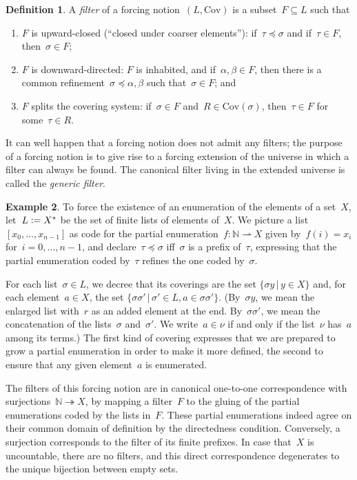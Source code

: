 \documentclass[com,11pt,crcready]{iosart2x}
\theoremstyle{definition}
\newtheorem{definition}{Definition}[section]
\newtheorem{example}[definition]{Example}
\theoremstyle{plain}
\theoremstyle{remark}
\newcommand{\?}{\,{:}\,}
\newcommand{\NN}{\mathbb{N}}
\newcommand{\defeq}{\vcentcolon=}
\newcommand{\Cov}{\mathrm{Cov}}
\renewcommand{\_}{\mathpunct{.}\,}
\begin{document}
\begin{definition}A \emph{filter} of a forcing notion~$(L,\mathrm{Cov})$
is a subset~$F \subseteq L$ such that
\begin{enumerate}
\item $F$ is upward-closed (``closed under coarser elements''): if~$\tau \preceq \sigma$ and if~$\tau \in F$,
then~$\sigma \in F$;
\item $F$ is downward-directed: $F$ is inhabited, and if~$\alpha,\beta \in F$,
then there is a common refinement~$\sigma \preceq \alpha,\beta$ such
that~$\sigma \in F$; and
\item $F$ splits the covering system: if~$\sigma \in F$ and~$R \in
\Cov(\sigma)$, then~$\tau \in F$ for some~$\tau \in R$.
\end{enumerate}
\end{definition}

It can well happen that a forcing notion does not admit any filters; the
purpose of a forcing notion is to give rise to a forcing extension of the
universe in which a filter can always be found. The canonical filter living in
the extended universe is called the \emph{generic filter}.

\begin{example}\label{ex:notion-enum}To force the existence of an enumeration
of the elements of a set~$X$, let~$L \defeq X^*$ be the set of finite lists
of elements of~$X$. We picture a list~$[x_0,\ldots,x_{n-1}]$ as code for the
partial enumeration~$f : \NN \rightharpoonup X$ given by~$f(i) = x_i$
for~$i=0,\ldots,n-1$, and declare~$\tau \preceq \sigma$ iff~$\sigma$ is a prefix
of~$\tau$, expressing that the partial enumeration coded by~$\tau$ refines the
one coded by~$\sigma$.

For each list~$\sigma \in L$, we decree that its coverings are the set
$\{ \sigma y \,|\, y \in X \}$
and, for each element~$a \in X$, the set
$\{ \sigma \sigma' \,|\, \sigma' \in L, a \in \sigma \sigma'
\}$. (By~$\sigma y$, we mean the enlarged list with~$r$ as an
added element at the end. By~$\sigma \sigma'$, we mean the concatenation
of the lists~$\sigma$ and~$\sigma'$. We write~$a \in \nu$ if and only if the
list~$\nu$ has~$a$ among its terms.)
The first kind of covering expresses that we are prepared to grow a partial
enumeration in order to make it more defined, the second to ensure
that any given element~$a$ is enumerated.

The filters of this forcing notion
are in canonical one-to-one correspondence with
surjections~$\NN \twoheadrightarrow X$, by mapping a filter~$F$ to the gluing
of the partial enumerations coded by the lists in~$F$. These partial
enumerations indeed agree on their common domain of definition by the
directedness condition. Conversely, a surjection corresponds to the filter of
its finite prefixes. In case that~$X$ is uncountable, there are no filters, and
this direct correspondence degenerates to the unique bijection between
empty sets.
\end{example}
\end{document}
